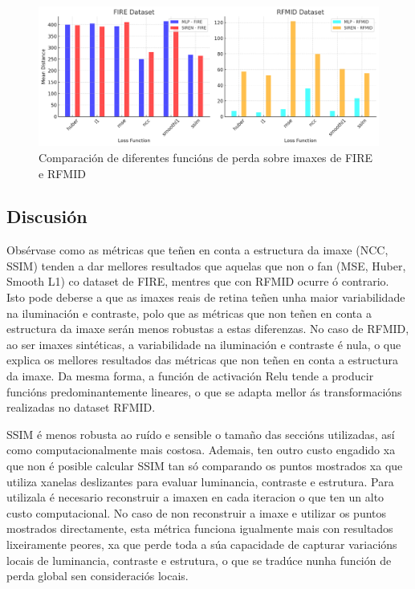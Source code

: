 \begin{figure}[tbp]
    \centering
    \includegraphics[width=1\textwidth]{imaxes/losstype.png}
    \caption{Comparación de diferentes funcións de perda sobre imaxes de FIRE e RFMID}
    \label{fig:loss_functions_comparison}
\end{figure}

\subsection{Discusión}
\label{subsec:Discusion-loss}

Obsérvase como as métricas que teñen en conta a estructura da imaxe (NCC, SSIM) tenden a dar mellores resultados que aquelas que non o fan (MSE, Huber, Smooth L1) co dataset de FIRE, mentres que con RFMID ocurre ó contrario.
Isto pode deberse a que as imaxes reais de retina teñen unha maior variabilidade na iluminación e contraste, polo que as métricas que non teñen en conta a estructura da imaxe serán menos robustas a estas diferenzas.
No caso de RFMID, ao ser imaxes sintéticas, a variabilidade na iluminación e contraste é nula, o que explica os mellores resultados das métricas que non teñen en conta a estructura da imaxe.
Da mesma forma, a función de activación Relu tende a producir funcións predominantemente lineares, o que se adapta mellor ás transformacións realizadas no dataset RFMID.

SSIM é menos robusta ao ruído e sensible o tamaño das seccións utilizadas, así como computacionalmente mais costosa. Ademais, ten outro custo engadido xa que non é posible calcular SSIM tan só comparando os puntos mostrados xa que utiliza xanelas deslizantes para evaluar luminancia, contraste e estrutura. 
Para utilizala é necesario reconstruir a imaxen en cada iteracion o que ten un alto custo computacional.
No caso de non reconstruir a imaxe e utilizar os puntos mostrados directamente, esta métrica funciona igualmente mais con resultados lixeiramente peores, xa que perde toda a súa capacidade de capturar variacións locais de luminancia, contraste e estrutura, o que se tradúce nunha función de perda global sen consideraciós locais.

